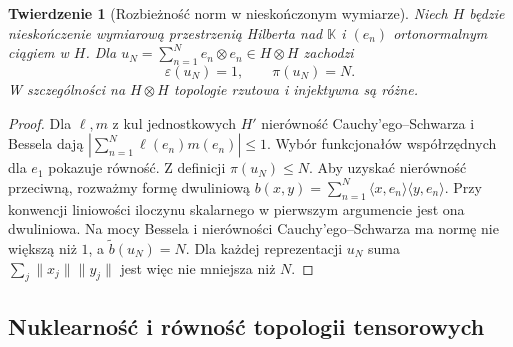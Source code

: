 \documentclass[11pt,a4paper]{article}
\numberwithin{equation}{section}
\theoremstyle{plain}
\newtheorem{twierdzenie}{Twierdzenie}[section]
\theoremstyle{definition}
\theoremstyle{remark}
\newcommand{\K}{\mathbb K}
\begin{document}
\begin{twierdzenie}[Rozbieżność norm w nieskończonym wymiarze]
\label{thm:hilbert-norms24}
Niech $H$ będzie nieskończenie wymiarową przestrzenią Hilberta
nad $\K$ i $(e_n)$ ortonormalnym ciągiem w $H$. Dla
$u_N=\sum_{n=1}^N e_n\otimes e_n\in H\otimes H$ zachodzi
\[ \varepsilon(u_N)=1,\qquad \pi(u_N)=N. \]
W szczególności na $H\otimes H$ topologie rzutowa i
injektywna są różne.
\end{twierdzenie}
\begin{proof}
Dla $\ell,m$ z kul jednostkowych $H'$ nierówność
Cauchy'ego--Schwarza i Bessela dają
$|\sum_{n=1}^N\ell(e_n)m(e_n)|\le1$. Wybór funkcjonałów
współrzędnych dla $e_1$ pokazuje równość. Z definicji
$\pi(u_N)\le N$. Aby uzyskać nierówność przeciwną,
rozważmy formę dwuliniową
$b(x,y)=\sum_{n=1}^N\langle x,e_n\rangle\langle y,e_n\rangle$.
Przy konwencji liniowości iloczynu skalarnego w pierwszym
argumencie jest ona dwuliniowa. Na mocy Bessela i
nierówności Cauchy'ego--Schwarza ma normę nie większą niż $1$,
a $\widetilde b(u_N)=N$. Dla każdej reprezentacji $u_N$ suma
$\sum_j\|x_j\|\|y_j\|$ jest więc nie mniejsza niż $N$.
\end{proof}

\subsection{Nuklearność i równość topologii tensorowych}
\end{document}
